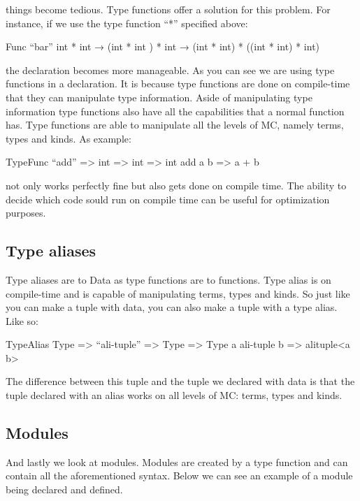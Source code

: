 things become tedious. Type functions offer a solution for this problem. For instance, if we use the type function “*” specified above:

\begin{code}
	Func “bar” int * int → (int * int ) * int → (int * int) * ((int * int) * int)
\end{code}

the declaration becomes more manageable.
\linebreak
As you can see we are using type functions in a declaration. It is because type functions are done on compile-time that they can manipulate type information.
\linebreak
Aside of manipulating type information type functions also have all the capabilities that a normal function has. Type functions are able to manipulate all the levels of MC, namely terms, types and kinds. As example:

\begin{code}
	TypeFunc “add” => int => int => int
	add a b => a + b
\end{code}

not only works perfectly fine but also gets done on compile time. The ability to decide which code sould run on compile time can be useful for optimization purposes. 

\subsection{Type aliases}

Type aliases are to Data as type functions are to functions. Type alias is on compile-time and is capable of manipulating terms, types and kinds. So just like you can make a tuple with data, you can also make a tuple with a type alias. Like so:

\begin{code}
	TypeAlias Type => “ali-tuple” => Type => Type
	a ali-tuple b => alituple<a b>
\end{code}

The difference between this tuple and the tuple we declared with data is that the tuple declared with an alias works on all levels of MC: terms, types and kinds. 


\subsection{Modules}

And lastly we look at modules.
\linebreak
Modules are created by a type function and can contain all the aforementioned syntax. Below we can see an example of a module being declared and defined.

